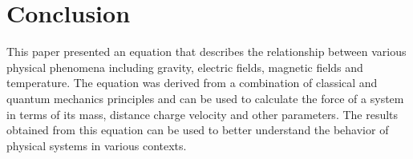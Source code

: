\documentclass[12pt]{article}
\begin{document}
    \section*{Conclusion}

    This paper presented an equation that describes the relationship between various physical phenomena including 
  gravity, electric fields, magnetic fields and temperature. The equation was derived from a combination of classical 
  and quantum mechanics principles and can be used to calculate the force of a system in terms of its mass, distance 
  charge velocity and other parameters. The results obtained from this equation can be used to better understand the 
  behavior of physical systems in various contexts.


     
\end{document}
